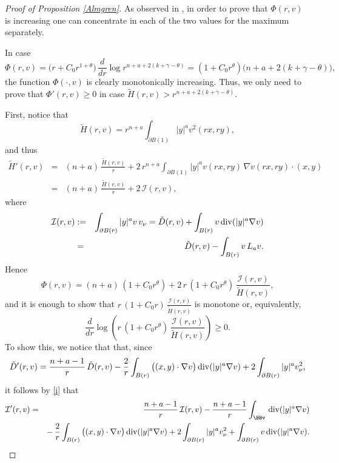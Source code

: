 \documentclass[11pt]{amsart}
\theoremstyle{plain}
\numberwithin{equation}{section}
\begin{document}
\begin{proof}[Proof of Proposition \ref{Almgren}]
As observed in \cite[Proof of Theorem 3.1]{CSS},
in order to prove that $\Phi(r,v)$ is increasing one can
concentrate in each of the two values for the maximum separately.

In case
\[\Phi(r,v)=\bigl(r+C_0r^{1+\theta}\bigr)\,\frac{d}{dr}\log r^{n+a+2(k+\gamma-\theta)}=(1+C_0r^\theta)\bigl(n+a+2(k+\gamma-\theta)\bigr),\]
the function $\Phi(\cdot,v)$ is clearly monotonically increasing.
Thus, we only need to prove that $\Phi'(r,v)\geq0$ in case $\tilde{H}(r,v)>r^{n+a+2(k+\gamma-\theta)}$.

First, notice that
$$\tilde{H}(r,v)=r^{n+a}\int_{\partial{B(1)}}{|y|^{a}v^{2}(rx,ry)},$$
and thus
\begin{eqnarray}
\tilde{H}'(r,v)&=&(n+a)\,\frac{\tilde{H}(r,v)}{r}+2\, r^{n+a}\int_{\partial{B(1)}}{|y|^{a}v(rx,ry)\,\nabla v(rx,ry)\cdot(x,y)}\nonumber\\
&=&(n+a)\,\frac{\tilde{H}(r,v)}{r}+2\,\mathcal{I}(r,v),\label{h'}
\end{eqnarray}
where
\begin{eqnarray}
\mathcal{I}(r,v)&:=&\int_{\partial {B(r)}}{|y|^{a} v \,v_{\nu}}=\tilde{D}(r,v)+\int_{B(r)}{v\, {{\rm div}} (|y|^{a}\nabla v)}\nonumber \\
&=&\tilde{D}(r,v)-\int_{B(r)}{v\, L_a v}.
\label{i}
\end{eqnarray}
Hence
\begin{equation}\label{mastarde}
\Phi(r,v)=(n+a)\,(1+C_0r^\theta)+2\,r\,(1+C_0r^\theta)\,\frac{\mathcal{I}(r,v)}{\tilde{H}(r,v)},
\end{equation}
and it is enough to show that $r\,(1+C_0r)\,\frac{\mathcal{I}(r,v)}{\tilde{H}(r,v)}$ is monotone or, equivalently,
\[\frac{d}{dr}\log\left( r\,(1+C_0r^\theta)\,\frac{\mathcal{I}(r,v)}{\tilde{H}(r,v)} \right) \geq0.\]
To show this, we notice that that, since
\[\tilde{D}'(r,v)=\frac{n+a-1}{r}\,\tilde{D}(r,v)-\frac{2}{r}\int_{B(r)}{\bigl((x,y)\cdot\nabla v\bigr)\, {{\rm div}}(|y|^{a}\nabla v)}+2\int_{\partial {B(r)}}{|y|^{a}v_{\nu}^{2}},\]
it follows by \eqref{i} that
\begin{eqnarray*}
\mathcal{I}'(r,v)&=&\frac{n+a-1}{r}\,\mathcal{I}(r,v)-\frac{n+a-1}{r}\int_\BBv\, {{\rm div}} (|y|^{a}\nabla v)\\
& &-\,\frac{2}{r}\int_{B(r)}{\bigl((x,y)\cdot\nabla v\bigr)\, {{\rm div}}(|y|^{a}\nabla v)}+2\int_{\partial {B(r)}}{|y|^{a}v_{\nu}^{2}}+\int_{\partial {B(r)}}{v\, {{\rm div}} (|y|^{a}\nabla v)}.
\end{eqnarray*}

\end{proof}
\end{document}
